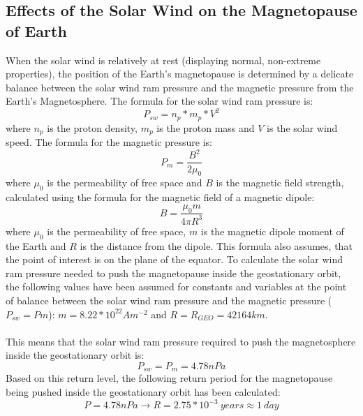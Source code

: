 \documentclass[12pt]{article}
\begin{document}
    \subsection{Effects of the Solar Wind on the Magnetopause of Earth}\label{sec:magnetoPAUSE}
        When the solar wind is relatively at rest (displaying normal, non-extreme properties), the position of the Earth's magnetopause is determined by a delicate balance between the solar wind ram pressure and the magnetic pressure from the Earth's Magnetosphere. The formula for the solar wind ram pressure is:
        \begin{equation}
            P_{sw}=n_p*m_p*V^2
        \end{equation}
        where $n_p$ is the proton density, $m_p$ is the proton mass and $V$ is the solar wind speed. The formula for the magnetic pressure is:
        \begin{equation}
            P_{m}=\frac{B^2}{2\mu_0}
        \end{equation}
        where $\mu_0$ is the permeability of free space and $B$ is the magnetic field strength, calculated using the formula for the magnetic field of a magnetic dipole:
        \begin{equation}
            B=\frac{\mu_0m}{4\pi R^3}
        \end{equation}
        where $\mu_0$ is the permeability of free space, $m$ is the magnetic dipole moment of the Earth and $R$ is the distance from the dipole. This formula also assumes, that the point of interest is on the plane of the equator. To calculate the solar wind ram pressure needed to push the magnetopause inside the geostationary orbit, the following values have been assumed for constants and variables at the point of balance between the solar wind ram pressure and the magnetic pressure ($P_{sw}=P{m}$): $m=8.22*10^{22}Am^{-2}$ and $R=R_{GEO}=42164km$.\\ \\
        This means that the solar wind ram pressure required to push the magnetosphere inside the geostationary orbit is:
        \begin{equation}
            P_{sw}=P_{m}=4.78nPa
        \end{equation}
        Based on this return level, the following return period for the magnetopause being pushed inside the geostationary orbit has been calculated:
        \begin{equation}
            P=4.78nPa\rightarrow R=2.75*10^{-3}\ years\approx1\ day
        \end{equation}
\end{document}
